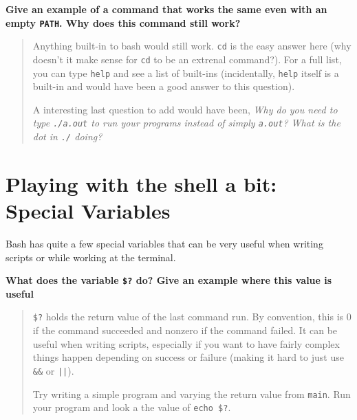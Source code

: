 \documentclass{article}
\begin{document}
\textbf{Give an example of a command that works the same even with an empty
\texttt{PATH}. Why does this command still work?}
\begin{quote}
  \color{violet}
  Anything built-in to bash would still work. \texttt{cd} is the easy answer
  here (why doesn't it make sense for \texttt{cd} to be an extrenal command?).
  For a full list, you can type \texttt{help} and see a list of built-ins
  (incidentally, \texttt{help} itself is a built-in and would have been a
  good answer to this question).

  A interesting last question to add would have been, \emph{Why do you need to
    type \texttt{./a.out} to run your programs instead of simply
  \texttt{a.out}? What is the dot in \texttt{./} doing?}
\end{quote}


\newpage
\section{Playing with the shell a bit: Special Variables}

Bash has quite a few special variables that can be very useful when writing
scripts or while working at the terminal.

\textbf{What does the variable \texttt{\$?} do? Give an example where this
value is useful}
\begin{quote}
  \color{violet}
  \texttt{\$?} holds the return value of the last command run. By convention,
  this is 0 if the command succeeded and nonzero if the command failed.
  It can be useful when writing scripts, especially if you want to have fairly
  complex things happen depending on success or failure (making it hard to
  just use \texttt{\&\&} or \texttt{||}).

  Try writing a simple program and varying the return value from
  \texttt{main}. Run your program and look a the value of \texttt{echo \$?}.
\end{quote}
\end{document}
